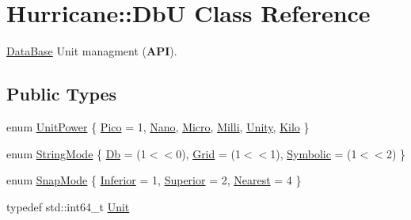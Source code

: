 \hypertarget{classHurricane_1_1DbU}{}\section{Hurricane\+:\+:DbU Class Reference}
\label{classHurricane_1_1DbU}


\mbox{\hyperlink{classHurricane_1_1DataBase}{Data\+Base}} Unit managment ({\bfseries A\+PI}).  


\subsection*{Public Types}
\begin{DoxyCompactItemize}
\item 
enum \mbox{\hyperlink{group__DbUGroup_ga50b5785bf4d75026c4c112caec3040a7}{Unit\+Power}} \{ \newline
\mbox{\hyperlink{group__DbUGroup_gga50b5785bf4d75026c4c112caec3040a7a3cf34ad82faf73a9b48dcb3a621d0557}{Pico}} = 1, 
\newline
\mbox{\hyperlink{group__DbUGroup_gga50b5785bf4d75026c4c112caec3040a7a03e5923be5810db830626f2ca26319d6}{Nano}}, 
\newline
\mbox{\hyperlink{group__DbUGroup_gga50b5785bf4d75026c4c112caec3040a7aa0481a3398a6cbb0a68a523146f0a7fb}{Micro}}, 
\newline
\mbox{\hyperlink{group__DbUGroup_gga50b5785bf4d75026c4c112caec3040a7aac2973886c68f16ee68a192154ea65be}{Milli}}, 
\newline
\mbox{\hyperlink{group__DbUGroup_gga50b5785bf4d75026c4c112caec3040a7ac5c524bb7247124f3dce7d1dbdc7d2c6}{Unity}}, 
\newline
\mbox{\hyperlink{group__DbUGroup_gga50b5785bf4d75026c4c112caec3040a7a7853e18601786b5c51a1bc9cfaf8bb74}{Kilo}}
 \}
\item 
enum \mbox{\hyperlink{group__DbUGroup_ga6af6a5b8d113a661fea65b2bcb8b25c4}{String\+Mode}} \{ \newline
\mbox{\hyperlink{group__DbUGroup_gga6af6a5b8d113a661fea65b2bcb8b25c4a1b91af5faf467afcb73dec10bc54f233}{Db}} = (1$<$$<$0), 
\newline
\mbox{\hyperlink{group__DbUGroup_gga6af6a5b8d113a661fea65b2bcb8b25c4ac6b6574b2ef79ee4e44c6c00fe757c7c}{Grid}} = (1$<$$<$1), 
\newline
\mbox{\hyperlink{group__DbUGroup_gga6af6a5b8d113a661fea65b2bcb8b25c4a16f8df0900c42b001f0a91475a1b93f8}{Symbolic}} = (1$<$$<$2)
 \}
\item 
enum \mbox{\hyperlink{group__DbUGroup_ga1082168d6f9956ebba22ab8bbec21637}{Snap\+Mode}} \{ \newline
\mbox{\hyperlink{group__DbUGroup_gga1082168d6f9956ebba22ab8bbec21637a888eae532f84c3f19b024e1830ef8cb3}{Inferior}} = 1, 
\newline
\mbox{\hyperlink{group__DbUGroup_gga1082168d6f9956ebba22ab8bbec21637a8ce92cf7ff7627c46baf85612f9ad847}{Superior}} = 2, 
\newline
\mbox{\hyperlink{group__DbUGroup_gga1082168d6f9956ebba22ab8bbec21637a65e6f47eb16779b8974a80d6145a2db5}{Nearest}} = 4
 \}
\item 
typedef std\+::int64\+\_\+t \mbox{\hyperlink{group__DbUGroup_ga4fbfa3e8c89347af76c9628ea06c4146}{Unit}}
\end{DoxyCompactItemize}
